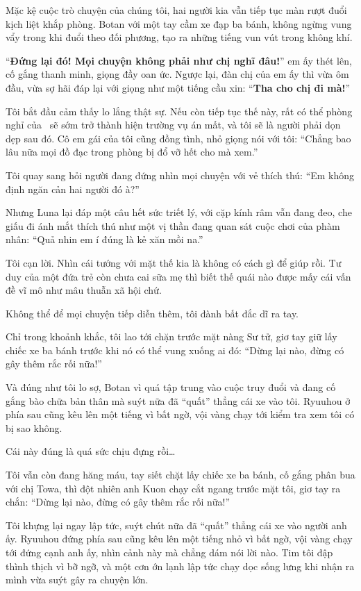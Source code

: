 \documentclass[../main.tex]{subfiles}
\begin{document}
Mặc kệ cuộc trò chuyện của chúng tôi, hai người kia vẫn tiếp tục màn rượt đuổi kịch liệt khắp phòng. Botan với một tay cầm xe đạp ba bánh, không ngừng vung vẩy trong khi đuổi theo đối phương, tạo ra những tiếng vun vút trong không khí.

``\textbf{Đứng lại đó! Mọi chuyện không phải như chị nghĩ đâu!}'' em ấy thét lên, cố gắng thanh minh, giọng đầy oan ức. Ngược lại, đàn chị của em ấy thì vừa ôm đầu, vừa sợ hãi đáp lại với giọng như một tiếng cầu xin: ``\textbf{Tha cho chị đi mà!}''

Tôi bắt đầu cảm thấy lo lắng thật sự. Nếu còn tiếp tục thế này, rất có thể phòng nghỉ của \hll\ sẽ sớm trở thành hiện trường vụ án mất, và tôi sẽ là người phải dọn dẹp sau đó. Cô em gái của tôi cũng đồng tình, nhỏ giọng nói với tôi: ``Chẳng bao lâu nữa mọi đồ đạc trong phòng bị đổ vỡ hết cho mà xem.''

Tôi quay sang hỏi người đang đứng nhìn mọi chuyện với vẻ thích thú: ``Em không định ngăn cản hai người đó à?''

Nhưng Luna lại đáp một câu hết sức triết lý, với cặp kính râm vẫn đang đeo, che giấu đi ánh mắt thích thú như một vị thần đang quan sát cuộc chơi của phàm nhân: ``Quả nhin em í đúng là kẻ xăn mồi na.''

Tôi cạn lời. Nhìn cái tướng với mặt thế kia là không có cách gì để giúp rồi. Tư duy của một đứa trẻ còn chưa cai sữa mẹ thì biết thế quái nào được mấy cái vấn đề vĩ mô như mâu thuẫn xã hội chứ.

Không thể để mọi chuyện tiếp diễn thêm, tôi đành bất đắc dĩ ra tay.

Chỉ trong khoảnh khắc, tôi lao tới chặn trước mặt nàng Sư tử, giơ tay giữ lấy chiếc xe ba bánh trước khi nó có thể vung xuống ai đó: ``Dừng lại nào, đừng có gây thêm rắc rối nữa!''

Và đúng như tôi lo sợ, Botan vì quá tập trung vào cuộc truy đuổi và đang cố gắng bào chữa bản thân mà suýt nữa đã ``quất'' thẳng cái xe vào tôi. Ryuuhou ở phía sau cũng kêu lên một tiếng vì bất ngờ, vội vàng chạy tới kiểm tra xem tôi có bị sao không.

Cái này đúng là quá sức chịu đựng rồi\dots


Tôi vẫn còn đang hăng máu, tay siết chặt lấy chiếc xe ba bánh, cố gắng phân bua với chị Towa, thì đột nhiên anh Kuon chạy cắt ngang trước mặt tôi, giơ tay ra chắn: ``Dừng lại nào, đừng có gây thêm rắc rối nữa!''

Tôi khựng lại ngay lập tức, suýt chút nữa đã ``quất'' thẳng cái xe vào người anh ấy. Ryuuhou đứng phía sau cũng kêu lên một tiếng nhỏ vì bất ngờ, vội vàng chạy tới đứng cạnh anh ấy, nhìn cảnh này mà chẳng dám nói lời nào. Tim tôi đập thình thịch vì bỡ ngỡ, và một cơn ớn lạnh lập tức chạy dọc sống lưng khi nhận ra mình vừa suýt gây ra chuyện lớn.
\end{document}
